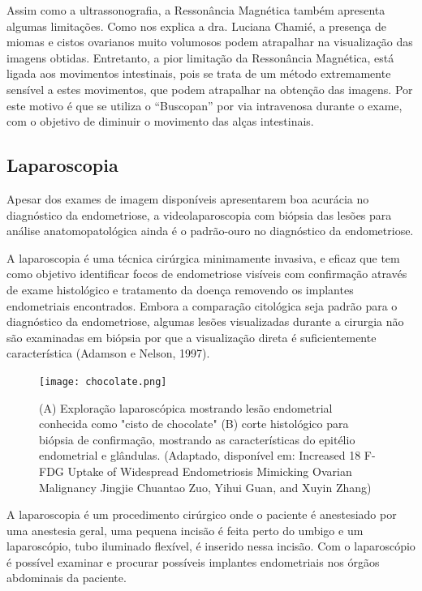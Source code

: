 \documentclass[12pt]{article} %
\begin{document}
Assim como a ultrassonografia, a Ressonância Magnética também apresenta algumas limitações. Como nos explica a dra. Luciana Chamié, a presença de miomas e cistos ovarianos muito volumosos podem atrapalhar na visualização das imagens obtidas. Entretanto, a pior limitação da Ressonância Magnética, está ligada aos movimentos intestinais, pois se trata de um método extremamente sensível a estes movimentos, que podem atrapalhar na obtenção das imagens. Por este motivo é que se utiliza o ``Buscopan'' por via intravenosa durante o exame, com o objetivo de diminuir o movimento das alças intestinais.

\subsection{Laparoscopia}

Apesar dos exames de imagem disponíveis apresentarem boa acurácia no diagnóstico da endometriose, a videolaparoscopia com biópsia das lesões para análise anatomopatológica ainda é o padrão-ouro no diagnóstico da endometriose.

A laparoscopia é uma técnica cirúrgica minimamente invasiva, e eficaz que tem como objetivo  identificar focos de endometriose visíveis com confirmação através de exame histológico e tratamento da doença removendo os implantes endometriais encontrados. Embora a comparação citológica seja padrão para
o diagnóstico da endometriose, algumas lesões visualizadas durante a
cirurgia não são examinadas em biópsia por que a visualização direta é
suficientemente característica (Adamson e Nelson, 1997). 


\begin{figure}[h!]
\centering
\texttt{[image: chocolate.png]}
\caption[Exploração laparoscópica e corte histológico]{(A) Exploração laparoscópica mostrando lesão endometrial conhecida como "cisto de chocolate" (B) corte histológico para biópsia  de confirmação, mostrando as características do epitélio endometrial e glândulas. (Adaptado, disponível em: Increased 18 F-FDG Uptake of Widespread Endometriosis Mimicking Ovarian Malignancy Jingjie Chuantao Zuo, Yihui Guan, and Xuyin Zhang)}
\end{figure}

A laparoscopia é um procedimento cirúrgico onde o paciente é
anestesiado por uma anestesia geral, uma pequena incisão é feita
perto do umbigo e um laparoscópio, tubo iluminado flexível, é inserido
nessa incisão. Com o laparoscópio é possível examinar e procurar
possíveis implantes endometriais nos órgãos abdominais da paciente.
\end{document}
